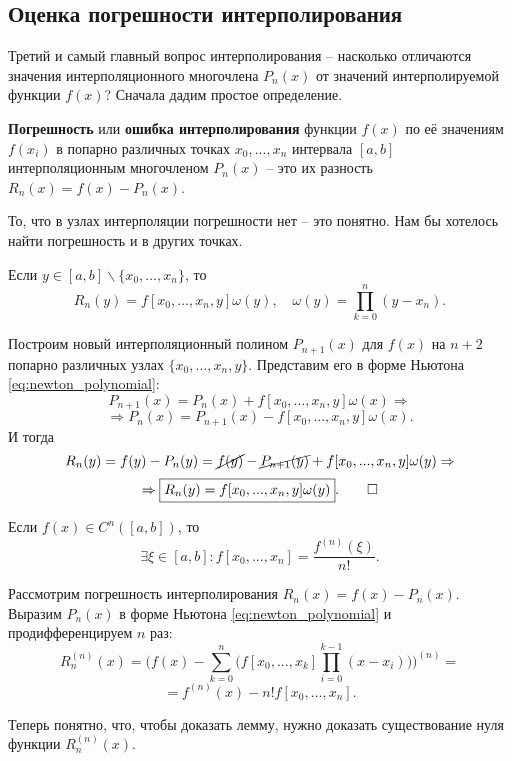 \documentclass[../main.tex]{subfile}
\begin{document}
\subsection{Оценка погрешности интерполирования}
Третий и самый главный вопрос интерполирования -- насколько отличаются значения
интерполяционного многочлена $P_n(x)$ от значений интерполируемой функции $f(x)$?
Сначала дадим простое определение.

\begin{define}\label{eq:interpolation_error}
	\textbf{Погрешность} или \textbf{ошибка интерполирования} функции $f(x)$
	по её значениям $f(x_i)$ в попарно различных точках $x_0,...,x_n$
	интервала $[a,b]$ интерполяционным многочленом $P_n(x)$ -- это их
	разность $\boxed{R_n(x)=f(x)-P_n(x)}$.
\end{define}

То, что в узлах интерполяции погрешности нет -- это понятно. Нам бы хотелось
найти погрешность и в других точках.

\begin{lemma}\label{eq:interpolation_error_form}
	Если $y\in[a,b]\backslash\{x_0,...,x_n\}$, то
	\[R_n(y)=f[x_0,...,x_n,y]\omega(y),\quad
	\omega(y)=\prod_{k=0}^{n}(y-x_n).\]
\end{lemma}

\beginproof

	Построим новый интерполяционный полином $P_{n+1}(x)$ для $f(x)$ на
	$n+2$ попарно различных узлах $\{x_0,...,x_n,y\}$. Представим его в форме
	Ньютона \eqref{eq:newton_polynomial}:
	\[P_{n+1}(x)=P_n(x)+f[x_0,...,x_n,y]\omega(x)\Rightarrow\]
	\[\Rightarrow P_n(x)=P_{n+1}(x)-f[x_0,...,x_n,y]\omega(x).\]
	И тогда
	\[R_n(y)=f(y)-P_n(y)=\cancel{f(y)}-\cancel{P_{n+1}(y)}+f[x_0,...,x_n,y]
	\omega(y)\Rightarrow\]
	\[\Rightarrow \boxed{R_n(y)=f[x_0,...,x_n,y]\omega(y)}.\qed\]

\begin{lemma}\label{eq:xi_in_ab}
	Если $f(x)\in C^n([a,b])$, то
	\[\exists\xi\in[a,b]:f[x_0,...,x_n] = \frac{f^{(n)}(\xi)}{n!}.\]
\end{lemma}

\beginproof

	Рассмотрим погрешность интерполирования $R_n(x)=f(x)-P_n(x)$. Выразим
	$P_n(x)$ в форме Ньютона \eqref{eq:newton_polynomial} и продифференцируем
	$n$ раз:
	\[R_n^{(n)}(x) = \Big(f(x) - \sum_{k=0}^{n}\big(f[x_0,...,x_k]\prod_
	{i=0}^{k-1}(x-x_i)\big)\Big)^{(n)}=\]
	\[=f^{(n)}(x) - n!f[x_0,...,x_n].\]

	Теперь понятно, что, чтобы доказать лемму, нужно доказать
	существование нуля функции $R_n^{(n)}(x)$.
\end{document}
